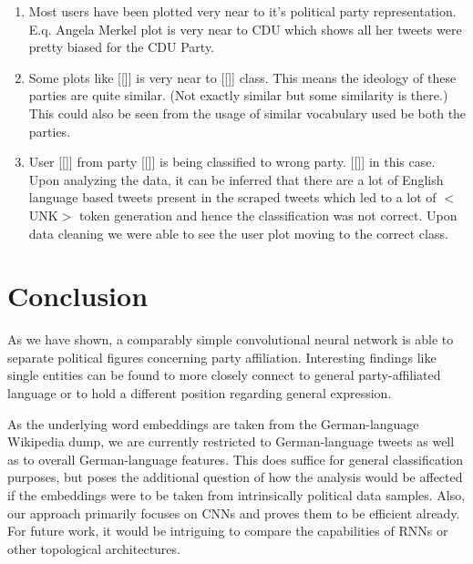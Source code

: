 \documentclass[10pt, oneside]{article}
\begin{document}
\begin{multicols}{2}
\begin{enumerate}
	\item Most users have been plotted very near to it’s political party representation. E.q. Angela Merkel plot is very near to CDU which shows all her tweets were pretty biased for the CDU Party.
	\item Some plots like [[]] is very near to [[]] class. This means the ideology of these parties are quite similar. (Not exactly similar but some similarity is there.) This could also be seen from the usage of similar vocabulary used be both the parties.
	\item User [[]] from party [[]] is being classified to wrong party. [[]] in this case. Upon analyzing the data, it can be inferred that there are a lot of English language based tweets present in the scraped tweets which led to a lot of $<$UNK$>$ token generation and hence the classification was not correct. Upon data cleaning we were able to see the user plot moving to the correct class. 
\end{enumerate}


\section{Conclusion}

As we have shown, a comparably simple convolutional neural network is able to separate political figures concerning party affiliation. Interesting findings like single entities can be found to more closely connect to general party-affiliated language or to hold a different position regarding general expression.

As the underlying word embeddings are taken from the German-language Wikipedia dump, we are currently restricted to German-language tweets as well as to overall German-language features. This does suffice for general classification purposes, but poses the additional question of how the analysis would be affected if the embeddings were to be taken from intrinsically political data samples. 
Also, our approach primarily focuses on CNNs and proves them to be efficient already. For future work, it would be intriguing to compare the capabilities of RNNs or other topological architectures. 





\end{multicols}
\end{document}
